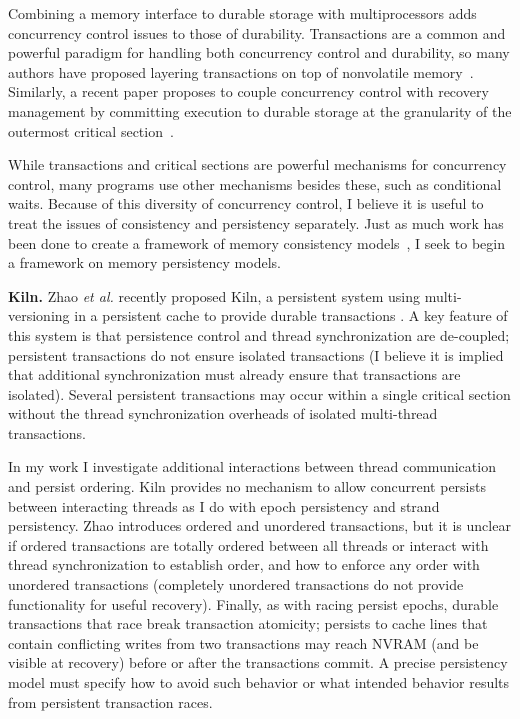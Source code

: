 Combining a memory interface to durable storage with multiprocessors adds concurrency control issues to those of durability.
Transactions are a common and powerful paradigm for handling both concurrency control and durability, so many authors have proposed layering transactions on top of nonvolatile memory~\cite{Lowell97,CoburnCaulfield11,VolosTack11,Coburn13}.
Similarly, a recent paper proposes to couple concurrency control with recovery management by committing execution to durable storage at the granularity of the outermost critical section~\cite{Chakrabarti13}.

While transactions and critical sections are powerful mechanisms for concurrency control, many programs use other mechanisms besides these, such as conditional waits.
Because of this diversity of concurrency control, I believe it is useful to treat the issues of consistency and persistency separately.
Just as much work has been done to create a framework of memory consistency models~\cite{Adve96}, I seek to begin a framework on memory persistency models.

\textbf{Kiln.}
Zhao \emph{et al.} recently proposed Kiln, a persistent system using multi-versioning in a persistent cache to provide durable transactions \cite{ZhaoLi13}.
A key feature of this system is that persistence control and thread synchronization are de-coupled; persistent transactions do not ensure isolated transactions (I believe it is implied that additional synchronization must already ensure that transactions are isolated).
Several persistent transactions may occur within a single critical section without the thread synchronization overheads of isolated multi-thread transactions.

In my work I investigate additional interactions between thread communication and persist ordering.
Kiln provides no mechanism to allow concurrent persists between interacting threads as I do with epoch persistency and strand persistency.
Zhao introduces ordered and unordered transactions, but it is unclear if ordered transactions are totally ordered between all threads or interact with thread synchronization to establish order, and how to enforce any order with unordered transactions (completely unordered transactions do not provide functionality for useful recovery).
Finally, as with racing persist epochs, durable transactions that race break transaction atomicity; persists to cache lines that contain conflicting writes from two transactions may reach NVRAM (and be visible at recovery) before or after the transactions commit.
A precise persistency model must specify how to avoid such behavior or what intended behavior results from persistent transaction races.

